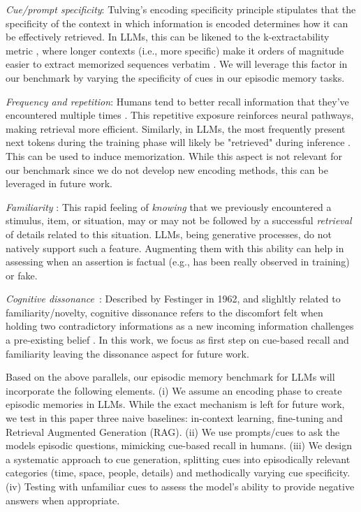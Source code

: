 \documentclass{article}
\begin{document}
\textit{Cue/prompt specificity}: Tulving's encoding specificity principle \citep{Tulving1973} stipulates that the specificity of the context in which information is encoded determines how it can be effectively retrieved. In LLMs, this can be likened to the k-extractability metric \citep{Biderman2023,Carlini2021}, where longer contexts (i.e., more specific) make it orders of magnitude easier to extract memorized sequences verbatim \citep{Carlini2022}. We will leverage this factor in our benchmark by varying the specificity of cues in our episodic memory tasks.

\textit{Frequency and repetition}: Humans tend to better recall information that they've encountered multiple times \citep{Scarborough1977}. This repetitive exposure reinforces neural pathways, making retrieval more efficient. Similarly, in LLMs, the most frequently present next tokens during the training phase will likely be "retrieved" during inference \citep{Mckenna2023,Kandpal2022}. This can be used to induce memorization. While this aspect is not relevant for our benchmark since we do not develop new encoding methods, this can be leveraged in future work. 

\textit{Familiarity} \citep{Mandler1980}: This rapid feeling of \textit{knowing} that we previously encountered a stimulus, item, or situation, may or may not be followed by a successful \textit{retrieval} of details related to this situation. LLMs, being generative processes, do not natively support such a feature. Augmenting them with this ability can help in assessing when an assertion is factual (e.g., has been really observed in training) or fake.

\textit{Cognitive dissonance}~\citep{Festinger1962}: Described by Festinger in 1962, and slighltly related to familiarity/novelty, cognitive dissonance refers to the discomfort felt when holding two contradictory informations as a new incoming information challenges a pre-existing belief \citep{Festinger1962}. In this work, we focus as first step on cue-based recall and familiarity leaving the dissonance aspect for future work. 

Based on the above parallels, our episodic memory benchmark for LLMs will incorporate the following elements. (i) We assume an encoding phase to create episodic memories in LLMs. While the exact mechanism is left for future work, we test in this paper three naive baselines: in-context learning, fine-tuning and Retrieval Augmented Generation (RAG). (ii) We use prompts/cues to ask the models episodic questions, mimicking cue-based recall in humans. (iii) We design a systematic approach to cue generation, splitting cues into episodically relevant categories (time, space, people, details) and methodically varying cue specificity. (iv) Testing with unfamiliar cues to assess the model's ability to provide negative answers when appropriate.
\end{document}
